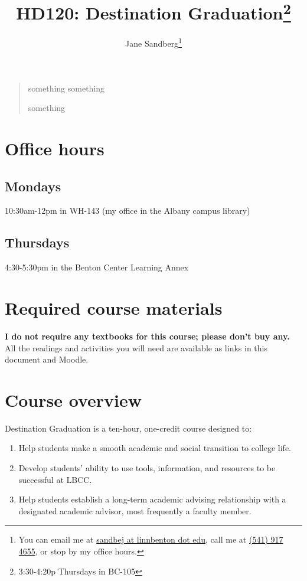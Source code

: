 \documentclass[12pt,article,oneside]{memoir}
\author{Jane Sandberg\thanks{You can email me at \href{mailto:sandbej@linnbenton.edu}{sandbej at linnbenton dot edu}, call me at \href{tel:5419174655}{(541) 917 4655}, or stop by my office hours.}}
\title{HD120: Destination Graduation\thanks{3:30-4:20p Thursdays in BC-105}}
\begin{document}
\renewcommand{\labelitemi}{$\triangleright$}
\setcounter{secnumdepth}{0}
\tightlists


\maketitle


\begin{quotation}
something
something

something 
\end{quotation}

\begin{htmlonly}
\tableofcontents
\end{htmlonly}

\section{Office hours}

\subsection{Mondays}
10:30am-12pm in WH-143 (my office in the Albany campus library)

\subsection{Thursdays}
4:30-5:30pm in the Benton Center Learning Annex

\section{Required course materials}
\textbf{I do not require any textbooks for this course; please don't buy any.}  All the readings and activities you will need are available as links in this document and Moodle.

\section{Course overview}
Destination Graduation is a ten-hour, one-credit course designed to:
\begin{enumerate}
 \item Help students make a smooth academic and social transition to college life.
 \item Develop students' ability to use tools, information, and resources to be successful at LBCC.
 \item Help students establish a long-term academic advising relationship with a designated academic advisor, most frequently a faculty member.
\end{enumerate}
\end{document}

